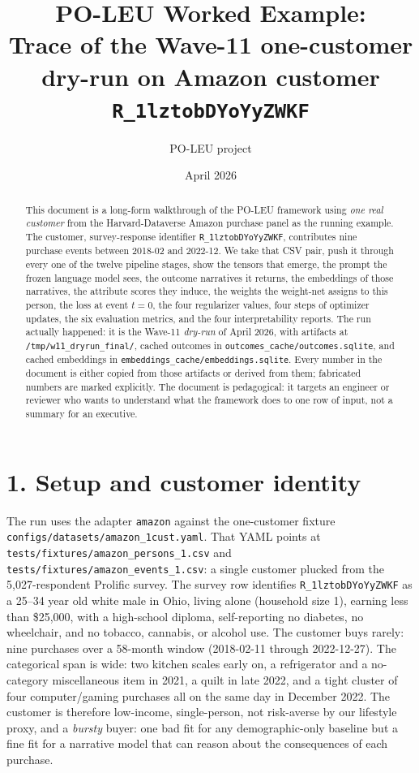 \documentclass[11pt,a4paper]{article}
\title{PO-LEU Worked Example:\\
\large Trace of the Wave-11 one-customer dry-run on Amazon customer \texttt{R\_1lztobDYoYyZWKF}}
\author{PO-LEU project}
\date{April 2026}
\begin{document}
\maketitle

\begin{abstract}
\noindent
This document is a long-form walkthrough of the PO-LEU framework using
\emph{one real customer} from the Harvard-Dataverse Amazon purchase panel
as the running example. The customer, survey-response identifier
\texttt{R\_1lztobDYoYyZWKF}, contributes nine purchase events between
2018-02 and 2022-12. We take that CSV pair, push it through every one of
the twelve pipeline stages, show the tensors that emerge, the prompt the
frozen language model sees, the outcome narratives it returns, the
embeddings of those narratives, the attribute scores they induce, the
weights the weight-net assigns to this person, the loss at event $t=0$,
the four regularizer values, four steps of optimizer updates, the six
evaluation metrics, and the four interpretability reports. The run
actually happened: it is the Wave-11 \emph{dry-run} of April 2026, with
artifacts at \texttt{/tmp/w11\_dryrun\_final/}, cached outcomes in
\texttt{outcomes\_cache/outcomes.sqlite}, and cached embeddings in
\texttt{embeddings\_cache/embeddings.sqlite}. Every number in the document
is either copied from those artifacts or derived from them; fabricated
numbers are marked explicitly. The document is pedagogical: it targets an
engineer or reviewer who wants to understand what the framework does to
one row of input, not a summary for an executive.
\end{abstract}

\section*{1. Setup and customer identity}

The run uses the adapter \texttt{amazon} against the one-customer fixture
\texttt{configs/datasets/amazon\_1cust.yaml}. That YAML points at
\texttt{tests/fixtures/amazon\_persons\_1.csv} and
\texttt{tests/fixtures/amazon\_events\_1.csv}: a single customer plucked
from the 5{,}027-respondent Prolific survey. The survey row identifies
\texttt{R\_1lztobDYoYyZWKF} as a 25--34 year old white male in Ohio,
living alone (household size 1), earning less than \$25{,}000, with a
high-school diploma, self-reporting no diabetes, no wheelchair, and no
tobacco, cannabis, or alcohol use. The customer buys rarely: nine
purchases over a 58-month window (2018-02-11 through 2022-12-27). The
categorical span is wide: two kitchen scales early on, a refrigerator
and a no-category miscellaneous item in 2021, a quilt in late 2022, and
a tight cluster of four computer/gaming purchases all on the same day
in December 2022. The customer is therefore low-income, single-person,
not risk-averse by our lifestyle proxy, and a \emph{bursty} buyer: one
bad fit for any demographic-only baseline but a fine fit for a
narrative model that can reason about the consequences of each
purchase.
\end{document}
